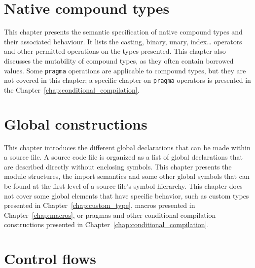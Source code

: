 \documentclass[a4paper,11pt]{book}
\begin{document}
\chapter{Native compound types}
\label{chap:compound}

This chapter presents the semantic specification of native compound types and
their associated behaviour. It lists the casting, binary, unary, index\ldots
operators and other permitted operations on the types presented. This chapter
also discusses the mutability of compound types, as they often contain borrowed
values. Some \texttt{pragma} operations are applicable to compound types, but
they are not covered in this chapter; a specific chapter on \texttt{pragma}
operators is presented in the Chapter~\ref{chap:conditional_compilation}.

\begin{multicols*}{2}
  \minitoc%
  
\end{multicols*}

\chapter{Global constructions}%
\label{chap:global_construction}

This chapter introduces the different global declarations that can be made
within a source file. A source code file is organized as a list of global
declarations that are described directly without enclosing symbols. This chapter
presents the module structures, the import semantics and some other global
symbols that can be found at the first level of a source file's symbol
hierarchy. This chapter does not cover some global elements that have specific
behavior, such as custom types presented in Chapter~\ref{chap:custom_type},
macros presented in Chapter~\ref{chap:macros}, or pragmas and other conditional
compilation constructions presented in
Chapter~\ref{chap:conditional_compilation}.

\begin{multicols*}{2}
  \minitoc%
  
\end{multicols*}

\chapter{Control flows}%
\label{chap:control_flows}
\end{document}
